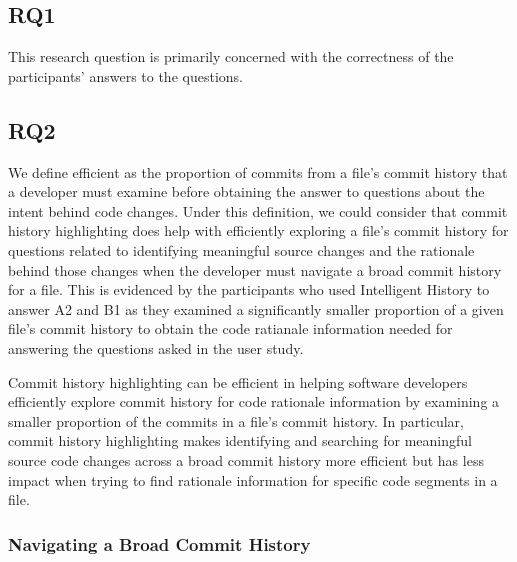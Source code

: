 \subsection{RQ1}
\label{subsec:RQ1}

This research question is primarily concerned with the correctness of the participants' answers to the questions.


\subsection{RQ2}
\label{subsec:RQ2}

We define efficient as the proportion of commits from a file's commit history that a developer must examine before obtaining the answer to questions about the intent behind code changes.
Under this definition, we could consider that commit history highlighting does help with efficiently exploring a file's commit history for questions related to identifying meaningful source changes and the rationale behind those changes when the developer must navigate a broad commit history for a file. 
This is evidenced by the participants who used Intelligent History to answer A2 and B1 as they examined a significantly smaller proportion of a given file's commit history to obtain the code ratianale information needed for answering the questions asked in the user study.

\begin{observation}
  Commit history highlighting can be efficient in helping software developers efficiently explore commit history for code rationale information by examining a smaller proportion of the commits in a file's commit history.
  In particular, commit history highlighting makes identifying and searching for meaningful source code changes across a broad commit history more efficient but has less impact when trying to find rationale information for specific code segments in a file.
\end{observation}

\subsubsection{Navigating a Broad Commit History}

